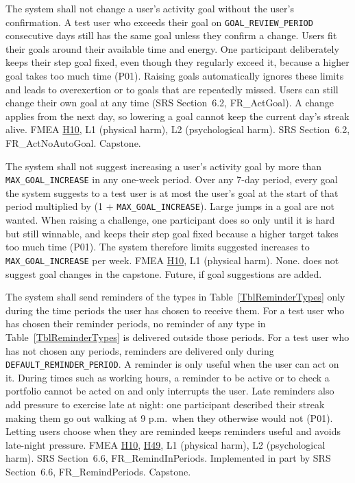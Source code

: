 \documentclass{article}
\newcommand{\hazref}[1]{\hyperref[#1]{#1}}
\begin{document}
\begin{description}
{The system shall not change a user's activity goal without the user's
confirmation.}
{A test user who exceeds their goal on \texttt{GOAL\_REVIEW\_PERIOD}
consecutive days still has the same goal unless they confirm a change.}
{Users fit their goals around their available time and energy. One participant
deliberately keeps their step goal fixed, even though they regularly exceed it,
because a higher goal takes too much time (P01). Raising goals automatically
ignores these limits and leads to overexertion or to goals that are repeatedly
missed. Users can still change their own goal at any time (SRS Section~6.2,
FR\_ActGoal). A change applies from the next day, so lowering a goal cannot
keep the current day's streak alive.}
{FMEA \hazref{H10}, L1 (physical harm), L2 (psychological harm).}
{SRS Section~6.2, FR\_ActNoAutoGoal.}
{Capstone.}

{The system shall not suggest increasing a user's activity goal by more than
\texttt{MAX\_GOAL\_INCREASE} in any one-week period.}
{Over any 7-day period, every goal the system suggests to a test user is at
most the user's goal at the start of that period multiplied by
(1 + \texttt{MAX\_GOAL\_INCREASE}).}
{Large jumps in a goal are not wanted. When raising a challenge, one participant
does so only until it is hard but still winnable, and keeps their step goal
fixed because a higher target takes too much time (P01). The system therefore
limits suggested increases to \texttt{MAX\_GOAL\_INCREASE} per week.}
{FMEA \hazref{H10}, L1 (physical harm).}
{None. \progname{} does not suggest goal changes in the capstone.}
{Future, if goal suggestions are added.}

{The system shall send reminders of the types in Table~\ref{TblReminderTypes}
only during the time periods the user has chosen to receive them.}
{For a test user who has chosen their reminder periods, no reminder of any type
in Table~\ref{TblReminderTypes} is delivered outside those periods. For a test
user who has not chosen any periods, reminders are delivered only during
\texttt{DEFAULT\_REMINDER\_PERIOD}.}
{A reminder is only useful when the user can act on it. During times such as
working hours, a reminder to be active or to check a portfolio cannot be acted
on and only interrupts the user. Late reminders also add pressure to exercise
late at night: one participant described their streak making them go out
walking at 9 p.m.\ when they otherwise would not (P01). Letting users choose
when they are reminded keeps reminders useful and avoids late-night pressure.}
{FMEA \hazref{H10}, \hazref{H49}, L1 (physical harm), L2 (psychological harm).}
{SRS Section~6.6, FR\_RemindInPeriods. Implemented in part by SRS
Section~6.6, FR\_RemindPeriods.}
{Capstone.}



\end{description}
\end{document}

